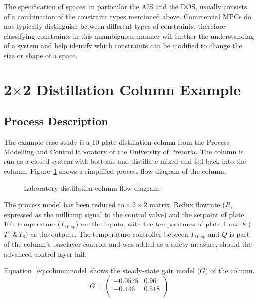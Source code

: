 \documentclass[final,authoryear,5pt,times,twocolumn]{elsarticle}
\newcommand{\bpm}{\begin{pmatrix}} %
\newcommand{\epm}{\end{pmatrix}}
\begin{document}
The specification of spaces, in particular the AIS and the DOS, usually consists of a combination of the constraint types mentioned above.
Commercial MPCs do not typically distinguish between different types of constraints, therefore classifying constraints in this unambiguous manner will further the understanding of a system and help identify which constraints can be modified to change the size or shape of a space.


\section{2$\times$2 Distillation Column Example}\label{sec:dist}
\subsection{Process Description}
The example case study is a 10-plate distillation column from the Process Modelling and Control laboratory of the University of Pretoria.
The column is run as a closed system with bottoms and distillate mixed and fed back into the column.
Figure~\ref{fig:columnpfd} shows a simplified process flow diagram of the column.
\begin{figure}[htbp]
  \centering
    \scalebox{1}{}
  \caption[Laboratory distillation column photo and flow diagram]{Laboratory distillation column flow diagram.}
  \label{fig:columnpfd}
\end{figure}

The process model has been reduced to a $2\times2$ matrix.
Reflux flowrate ($R$, expressed as the milliamp signal to the control valve) and the setpoint of plate 10's temperature ($T_{10~sp}$) are the inputs, with the temperatures of plate 1 and 8 ($T_1\text{ \& }T_{8}$) as the outputs.
The temperature controller between $T_{10~sp}$ and $Q$ is part of the column's baselayer controls and was added as a safety measure, should the advanced control layer fail.

Equation~\ref{eq:columnmodel} shows the steady-state gain model ($G$) of the column.
\begin{equation}
  \label{eq:columnmodel}
  G = \bpm -0.0575 & 0.96 \\       %
           -0.146  & 0.518 \\ \epm %
\end{equation}
\end{document}
